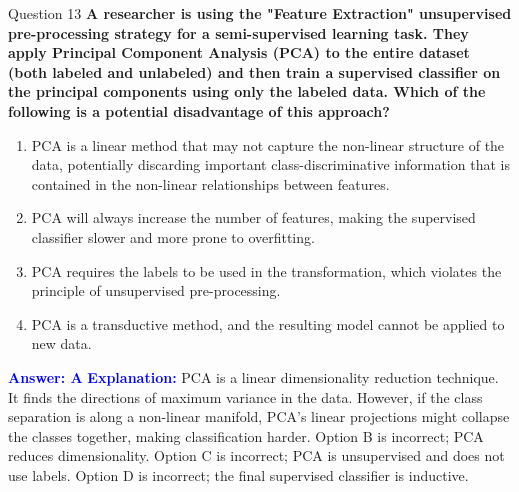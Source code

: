\documentclass[8pt]{beamer}  %
\begin{document}
	\begin{frame}{Question 13}
		\textbf{A researcher is using the "Feature Extraction" unsupervised pre-processing strategy for a semi-supervised learning task. They apply Principal Component Analysis (PCA) to the entire dataset (both labeled and unlabeled) and then train a supervised classifier on the principal components using only the labeled data. Which of the following is a potential disadvantage of this approach?}
		\begin{enumerate}
			\item PCA is a linear method that may not capture the non-linear structure of the data, potentially discarding important class-discriminative information that is contained in the non-linear relationships between features.
			\item PCA will always increase the number of features, making the supervised classifier slower and more prone to overfitting.
			\item PCA requires the labels to be used in the transformation, which violates the principle of unsupervised pre-processing.
			\item PCA is a transductive method, and the resulting model cannot be applied to new data.
		\end{enumerate}
		\vspace{0.2cm}
		\textcolor{blue}{\textbf{Answer: A}}
		\vspace{0.2cm}
		\textcolor{blue}{\textbf{Explanation:}} PCA is a linear dimensionality reduction technique. It finds the directions of maximum variance in the data. However, if the class separation is along a non-linear manifold, PCA's linear projections might collapse the classes together, making classification harder. Option B is incorrect; PCA reduces dimensionality. Option C is incorrect; PCA is unsupervised and does not use labels. Option D is incorrect; the final supervised classifier is inductive.
	\end{frame}
	
\end{document}
